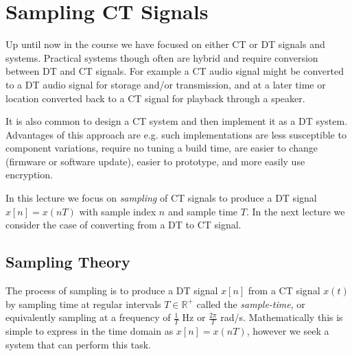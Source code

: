 \section{Sampling CT Signals}

Up until now in the course we have focused on either CT or DT signals and systems. Practical systems though often are hybrid and require conversion between DT and CT signals. For example a CT audio signal might be converted to a DT audio signal for storage and/or transmission, and at a later time or location converted back to a CT signal for playback through a speaker.

It is also common to design a CT system and then implement it as a DT system. Advantages of this approach are e.g. such implementations are less susceptible to component variations, require no tuning a build time, are easier to change (firmware or software update), easier to prototype, and more easily use encryption. 

In this lecture we focus on \emph{sampling} of CT signals to produce a DT signal $x[n] = x(nT)$ with sample index $n$ and sample time $T$. In the next lecture we consider the case of converting from a DT to CT signal. 

\subsection{Sampling Theory}

The process of sampling is to produce a DT signal $x[n]$ from a CT signal $x(t)$ by sampling time at regular intervals $T\in \mathbb{R}^+$ called the \emph{sample-time}, or equivalently sampling at a frequency of $\tfrac{1}{T}$ Hz or $\tfrac{2\pi}{T}$ rad/s. Mathematically this is simple to express in the time domain as $x[n] = x(nT)$, however we seek a system that can perform this task.

